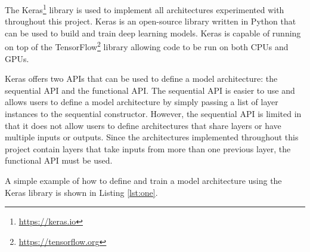 The Keras\footnote{\url{https://keras.io}} library is used to implement all architectures experimented with throughout this project. Keras is an open-source library written in Python that can be used to build and train deep learning models. Keras is capable of running on top of the TensorFlow\footnote{\url{https://tensorflow.org}} library allowing code to be run on both CPUs and GPUs.

Keras offers two APIs that can be used to define a model architecture: the sequential API and the functional API. The sequential API is easier to use and allows users to define a model architecture by simply passing a list of layer instances to the sequential constructor. However, the sequential API is limited in that it does not allow users to define architectures that share layers or have multiple inputs or outputs. Since the architectures implemented throughout this project contain layers that take inputs from more than one previous layer, the functional API must be used.

A simple example of how to define and train a model architecture using the Keras library is shown in Listing \ref{lst:one}.

